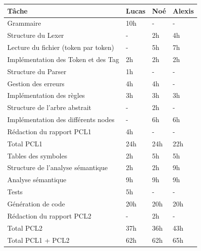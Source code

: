 \documentclass[french,a4paper]{article}
\begin{document}
    \begin{tabular}{@{}llll@{}}
        \toprule
        Tâche & Lucas & Noé & Alexis \\ \midrule
        Grammaire & 10h & - & - \\
        Structure du Lexer & - & 2h & 4h \\
        Lecture du fichier (token par token) & - & 5h & 7h \\
        Implémentation des Token et des Tag & 2h & 2h & 2h \\
        Structure du Parser & 1h & - & - \\
        Gestion des erreurs & 4h & 4h & - \\
        Implémentation des règles & 3h & 3h & 3h \\
        Structure de l'arbre abstrait & - & 2h & - \\
        Implémentation des différents nodes & - & 6h & 6h \\
        Rédaction du rapport PCL1 & 4h & - & - \\
        \midrule
        Total PCL1 & 24h & 24h & 22h \\ \bottomrule
        Tables des symboles & 2h & 5h & 5h \\
        Structure de l'analyse sémantique & 2h & 2h & 9h \\
        Analyse sémantique & 9h & 9h & 9h \\
        Tests & 5h & - & - \\
        Génération de code & 20h & 20h & 20h \\
        Rédaction du rapport PCL2 & - & 2h & - \\
        \midrule
        Total PCL2 & 37h & 36h & 43h \\ \bottomrule
        \midrule
        Total PCL1 + PCL2 & 62h & 62h & 65h \\ \bottomrule

    \end{tabular}
\end{document}

